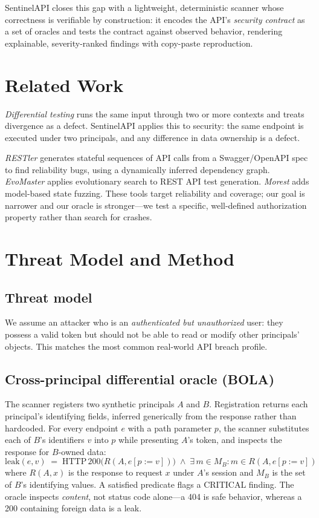 \documentclass[conference]{IEEEtran}
\begin{document}
SentinelAPI closes this gap with a lightweight, deterministic scanner whose
correctness is verifiable by construction: it encodes the API's \emph{security
contract} as a set of oracles and tests the contract against observed behavior,
rendering explainable, severity-ranked findings with copy-paste reproduction.

\section{Related Work}
\emph{Differential testing} \cite{mckeeman} runs the same input through two or
more contexts and treats divergence as a defect. SentinelAPI applies this to
security: the same endpoint is executed under two principals, and any
difference in data ownership is a defect.

\emph{RESTler} \cite{restler} generates stateful sequences of API calls from a
Swagger/OpenAPI spec to find reliability bugs, using a dynamically inferred
dependency graph. \emph{EvoMaster} \cite{evomaster} applies evolutionary search
to REST API test generation. \emph{Morest} \cite{morest} adds model-based state
fuzzing. These tools target reliability and coverage; our goal is narrower and
our oracle is stronger---we test a specific, well-defined authorization property
rather than search for crashes.

\section{Threat Model and Method}
\subsection{Threat model}
We assume an attacker who is an \emph{authenticated but unauthorized} user: they
possess a valid token but should not be able to read or modify other
principals' objects. This matches the most common real-world API breach profile.

\subsection{Cross-principal differential oracle (BOLA)}
The scanner registers two synthetic principals $A$ and $B$. Registration returns
each principal's identifying fields, inferred generically from the response
rather than hardcoded. For every endpoint $e$ with a path parameter $p$, the
scanner substitutes each of $B$'s identifiers $v$ into $p$ while presenting
$A$'s token, and inspects the response for $B$-owned data:
\begin{equation}
\mathrm{leak}(e,v) \;=\; \mathrm{HTTP}\,200\big(R(A,e[p{:=}v])\big)
\;\wedge\;
\exists\, m \in M_B : m \in R(A,e[p{:=}v])
\end{equation}
where $R(A,x)$ is the response to request $x$ under $A$'s session and $M_B$ is
the set of $B$'s identifying values. A satisfied predicate flags a CRITICAL
finding. The oracle inspects \emph{content}, not status code alone---a 404 is
safe behavior, whereas a 200 containing foreign data is a leak.
\end{document}
